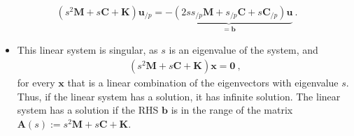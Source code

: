 \documentclass[letterpaper,10pt,english]{jupyterBook}
\begin{document}
\begin{equation*}
\begin{split}\left( s^2 \mathbf{M} + s \mathbf{C} + \mathbf{K} \right) \mathbf{u}_{/p} = \underbrace{- \left( 2 s s_{/p} \mathbf{M} + s_{/p} \mathbf{C} + s \mathbf{C}_{/p} \right) \mathbf{u}}_{= \mathbf{b}}\ .\end{split}
\end{equation*}\begin{itemize}
\item {} 
\sphinxAtStartPar
This linear system is singular, as \(s\) is an eigenvalue of the system, and
\begin{equation*}
\begin{split}\left( s^2 \mathbf{M} + s \mathbf{C} + \mathbf{K} \right) \mathbf{x} = \mathbf{0} \ ,\end{split}
\end{equation*}
\sphinxAtStartPar
for every \(\mathbf{x}\) that is a linear combination of the eigenvectors with eigenvalue \(s\). Thus, if the linear system has a solution, it has infinite solution. The linear system has a solution if the RHS \(\mathbf{b}\) is in the range of the matrix \(\mathbf{A}(s) := s^2 \mathbf{M} + s \mathbf{C} + \mathbf{K}\).


\end{itemize}
\end{document}
